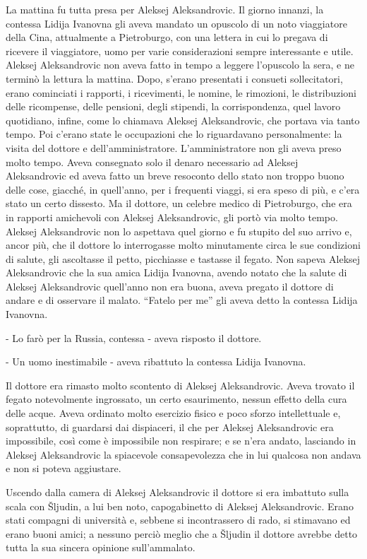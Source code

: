 La mattina fu tutta presa per Aleksej Aleksandrovic. Il giorno innanzi, la contessa Lidija Ivanovna gli aveva mandato un opuscolo di un noto viaggiatore della Cina, attualmente a Pietroburgo, con una lettera in cui lo pregava di ricevere il viaggiatore, uomo per varie considerazioni sempre interessante e utile. Aleksej Aleksandrovic non aveva fatto in tempo a leggere l'opuscolo la sera, e ne terminò la lettura la mattina. Dopo, s'erano presentati i consueti sollecitatori, erano cominciati i rapporti, i ricevimenti, le nomine, le rimozioni, le distribuzioni delle ricompense, delle pensioni, degli stipendi, la corrispondenza, quel lavoro quotidiano, infine, come lo chiamava Aleksej Aleksandrovic, che portava via tanto tempo. Poi c'erano state le occupazioni che lo riguardavano personalmente: la visita del dottore e dell'amministratore. L'amministratore non gli aveva preso molto tempo. Aveva consegnato solo il denaro necessario ad Aleksej Aleksandrovic ed aveva fatto un breve resoconto dello stato non troppo buono delle cose, giacché, in quell'anno, per i frequenti viaggi, si era speso di più, e c'era stato un certo dissesto. Ma il dottore, un celebre medico di Pietroburgo, che era in rapporti amichevoli con Aleksej Aleksandrovic, gli portò via molto tempo. Aleksej Aleksandrovic non lo aspettava quel giorno e fu stupito del suo arrivo e, ancor più, che il dottore lo interrogasse molto minutamente circa le sue condizioni di salute, gli ascoltasse il petto, picchiasse e tastasse il fegato. Non sapeva Aleksej Aleksandrovic che la sua amica Lidija Ivanovna, avendo notato che la salute di Aleksej Aleksandrovic quell'anno non era buona, aveva pregato il dottore di andare e di osservare il malato. ``Fatelo per me'' gli aveva detto la contessa Lidija Ivanovna. 

- Lo farò per la Russia, contessa - aveva risposto il dottore. 

- Un uomo inestimabile - aveva ribattuto la contessa Lidija Ivanovna. 

Il dottore era rimasto molto scontento di Aleksej Aleksandrovic. Aveva trovato il fegato notevolmente ingrossato, un certo esaurimento, nessun effetto della cura delle acque. Aveva ordinato molto esercizio fisico e poco sforzo intellettuale e, soprattutto, di guardarsi dai dispiaceri, il che per Aleksej Aleksandrovic era impossibile, così come è impossibile non respirare; e se n'era andato, lasciando in Aleksej Aleksandrovic la spiacevole consapevolezza che in lui qualcosa non andava e non si poteva aggiustare. 

Uscendo dalla camera di Aleksej Aleksandrovic il dottore si era imbattuto sulla scala con Šljudin, a lui ben noto, capogabinetto di Aleksej Aleksandrovic. Erano stati compagni di università e, sebbene si incontrassero di rado, si stimavano ed erano buoni amici; a nessuno perciò meglio che a Šljudin il dottore avrebbe detto tutta la sua sincera opinione sull'ammalato. 

